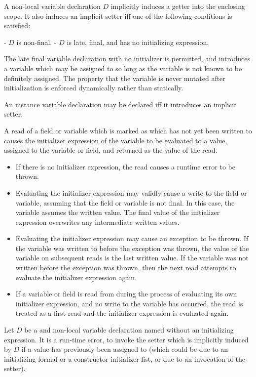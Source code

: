 \documentclass[makeidx]{article}
\begin{document}
{A non-local \LATE{} variable declaration $D$ implicitly induces a getter
into the enclosing scope.  It also induces an implicit setter iff one of the
following conditions is satisfied:

  - $D$ is non-final.
  - $D$ is late, final, and has no initializing expression.

The late final variable declaration with no initializer is permitted, and
introduces a variable which may be assigned to so long as the variable is not
known to be definitely assigned.  The property that the variable is never
mutated after initialization is enforced dynamically rather than statically.

An instance variable declaration may be declared \COVARIANT{} iff it introduces
an implicit setter.

A read of a field or variable which is marked as \LATE{} which has not yet been
written to causes the initializer expression of the variable to be evaluated to
a value, assigned to the variable or field, and returned as the value of the
read.

\begin{itemize}
\item If there is no initializer expression, the read causes a runtime error to be
    thrown.
\item Evaluating the initializer expression may validly cause a write to the field
    or variable, assuming that the field or variable is not final.  In this
    case, the variable assumes the written value.  The final value of the
    initializer expression overwrites any intermediate written values.
\item Evaluating the initializer expression may cause an exception to be thrown.
    If the variable was written to before the exception was thrown, the value of
    the variable on subsequent reads is the last written value.  If the variable
    was not written before the exception was thrown, then the next read attempts
    to evaluate the initializer expression again.
\item If a variable or field is read from during the process of evaluating its own
    initializer expression, and no write to the variable has occurred, the read
    is treated as a first read and the initializer expression is evaluated
    again.
\end{itemize}

Let $D$ be a \LATE{} and \FINAL{} non-local variable declaration named 
without an initializing expression.
It is a run-time error, to invoke the setter  which is
implicitly induced by $D$ if a value has previously been assigned to 
(which could be due to an initializing formal or a constructor initializer
list, or due to an invocation of the setter).

}
\end{document}
